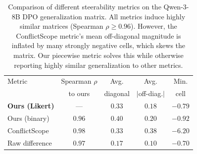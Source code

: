 \begin{table}[t]
\centering
\begin{tabular}{lcccc}
\toprule
Metric & Spearman $\rho$ & Avg. & Avg. & Min. \\
 & to ours & diagonal & $|$off-diag.$|$ & cell \\
\midrule
\textbf{Ours (Likert)} & --- & $0.33$ & $0.18$ & $-0.79$ \\
Ours (binary) & $0.96$ & $0.40$ & $0.20$ & $-0.92$ \\
ConflictScope \citep{liu2026generative} & $0.98$ & $0.33$ & $0.38$ & $-6.20$ \\
Raw difference & $0.97$ & $0.17$ & $0.10$ & $-0.70$ \\
\bottomrule
\end{tabular}
\caption{Comparison of different steerability metrics on the Qwen-3-8B DPO
generalization matrix. All metrics induce highly similar matrices (Spearman
$\rho \ge 0.96$). However, the ConflictScope metric's mean off-diagonal
magnitude is inflated by many strongly negative cells, which skews the matrix.
Our piecewise metric solves this while otherwise reporting highly similar
generalization to other metrics.}
\label{tab:metric-comparison}
\end{table}
